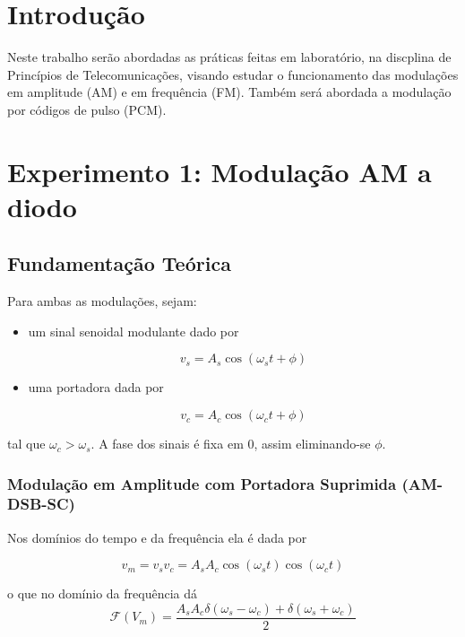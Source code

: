 \documentclass[]{report}
\title{}
\begin{document}

\tableofcontents

\chapter{Introdução}
Neste trabalho serão abordadas as práticas feitas em laboratório, na discplina de Princípios de Telecomunicações, visando estudar o funcionamento das modulações em amplitude (AM) e em frequência (FM). Também será abordada a modulação por códigos de pulso (PCM). 

\chapter{Experimento 1: Modulação AM a diodo}
\section{Fundamentação Teórica}
Para ambas as modulações, sejam:

\begin{itemize}
\item um sinal senoidal modulante dado por 

\begin{equation}\label{eq_modulante}
v_s = A_s \cos(\omega_s t + \phi)
\end{equation}

\item uma portadora dada por

\begin{equation}\label{eq_portadora}
v_c = A_c \cos(\omega_c t + \phi)
\end{equation}
\end{itemize}
tal que $\omega_c > \omega_s$. A fase dos sinais é fixa em $0$, assim eliminando-se $\phi$. 

\subsection{Modulação em Amplitude com Portadora Suprimida (AM-DSB-SC)}
Nos domínios do tempo e da frequência ela é dada por

\begin{equation}\label{eq_am_dsb_sc_tempo}
v_m = v_s v_c = A_s A_c \cos(\omega_s t) \cos(\omega_c t)
\end{equation}

o que no domínio da frequência dá
\begin{equation}
\mathcal{F}(V_m)= \frac{A_s A_c \delta(\omega_s - \omega_c) + \delta(\omega_s + \omega_c)}{2}
\end{equation}
\end{document}
